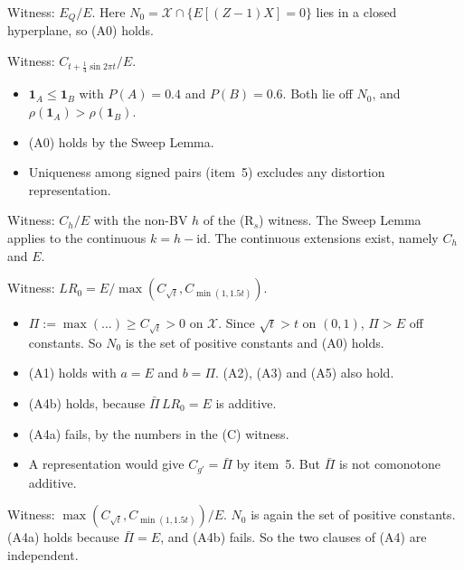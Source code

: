 \begin{example}[(A2)]
Witness: $E_Q/E$. Here $N_0=\mathcal X\cap\{E[(Z-1)X]=0\}$ lies in a closed hyperplane, so (A0) holds.
\end{example}

\begin{example}[(A3)]
Witness: $C_{t+\frac14\sin2\pi t}/E$.
\begin{itemize}
\item $\mathbf 1_A\le\mathbf 1_B$ with $P(A)=0.4$ and $P(B)=0.6$. Both lie off $N_0$, and $\rho(\mathbf 1_A)>\rho(\mathbf 1_B)$.
\item (A0) holds by the Sweep Lemma.
\item Uniqueness among signed pairs (item~5) excludes any distortion representation.
\end{itemize}
\end{example}

\begin{example}[(A3$_s$) in Theorem C$'$]
Witness: $C_h/E$ with the non-BV $h$ of the (R$_s$) witness. The Sweep Lemma applies to the continuous $k=h-\mathrm{id}$. The continuous extensions exist, namely $C_h$ and $E$.
\end{example}

\begin{example}
Witness: $LR_0=E/\max(C_{\sqrt t},C_{\min(1,1.5t)})$.
\begin{itemize}
\item $\Pi:=\max(\dots)\ge C_{\sqrt t}>0$ on $\mathcal X$. Since $\sqrt t>t$ on $(0,1)$, $\Pi>E$ off constants. So $N_0$ is the set of positive constants and (A0) holds.
\item (A1) holds with $a=E$ and $b=\Pi$. (A2), (A3) and (A5) also hold.
\item (A4b) holds, because $\bar\Pi\,LR_0=E$ is additive.
\item (A4a) fails, by the numbers in the (C) witness.
\item A representation would give $C_{g'}=\bar\Pi$ by item~5. But $\bar\Pi$ is not comonotone additive.
\end{itemize}
\end{example}

\begin{example}[(A4b)]
Witness: $\max(C_{\sqrt t},C_{\min(1,1.5t)})/E$. $N_0$ is again the set of positive constants. (A4a) holds because $\bar\Pi=E$, and (A4b) fails. So the two clauses of (A4) are independent.
\end{example}

